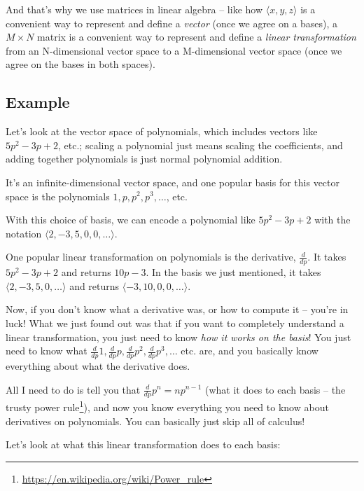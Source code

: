 \documentclass[]{article}
\renewcommand{\href}[2]{#2\footnote{\url{#1}}}
\begin{document}
And that's why we use matrices in linear algebra -- like how
\(\langle x, y, z \rangle\) is a convenient way to represent and define a
\emph{vector} (once we agree on a bases), a \(M \times N\) matrix is a
convenient way to represent and define a \emph{linear transformation} from an
N-dimensional vector space to a M-dimensional vector space (once we agree on the
bases in both spaces).

\hypertarget{example}{%
\subsection{Example}\label{example}}

Let's look at the vector space of polynomials, which includes vectors like
\(5 p^2 - 3 p + 2\), etc.; scaling a polynomial just means scaling the
coefficients, and adding together polynomials is just normal polynomial
addition.

It's an infinite-dimensional vector space, and one popular basis for this vector
space is the polynomials \(1, p, p^2, p^3, \ldots\), etc.

With this choice of basis, we can encode a polynomial like \(5 p^2 - 3 p + 2\)
with the notation \(\langle 2, -3, 5, 0, 0, \ldots \rangle\).

One popular linear transformation on polynomials is the derivative,
\(\frac{d}{dp}\). It takes \(5 p^2 - 3 p + 2\) and returns \(10 p - 3\). In the
basis we just mentioned, it takes \(\langle 2, -3, 5, 0, \ldots \rangle\) and
returns \(\langle -3, 10, 0, 0, \ldots \rangle\).

Now, if you don't know what a derivative was, or how to compute it -- you're in
luck! What we just found out was that if you want to completely understand a
linear transformation, you just need to know \emph{how it works on the basis}!
You just need to know what
\(\frac{d}{dp} 1, \frac{d}{dp} p, \frac{d}{dp} p^2, \frac{d}{dp} p^3, \ldots\)
etc. are, and you basically know everything about what the derivative does.

All I need to do is tell you that \(\frac{d}{dp} p^n = n p^{n - 1}\) (what it
does to each basis -- the trusty
\href{https://en.wikipedia.org/wiki/Power_rule}{power rule}), and now you know
everything you need to know about derivatives on polynomials. You can basically
just skip all of calculus!

Let's look at what this linear transformation does to each basis:
\end{document}
